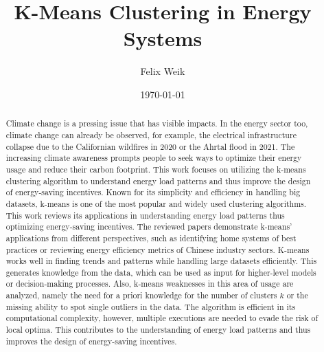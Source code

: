 \documentclass{revtex4-2}
\begin{document}
\title{K-Means Clustering in Energy Systems}
\author{Felix Weik}
\date{\today}


\begin{abstract}
Climate change is a pressing issue that has visible impacts.
In the energy sector too, climate change can already be observed, for example, the electrical infrastructure collapse due to the Californian wildfires in 2020 or the Ahrtal flood in 2021.
The increasing climate awareness prompts people to seek ways to optimize their energy usage and reduce their carbon footprint.
This work focuses on utilizing the k-means clustering algorithm to understand energy load patterns and thus improve the design of energy-saving incentives.
Known for its simplicity and efficiency in handling big datasets, k-means is one of the most popular and widely used clustering algorithms.
This work reviews its applications in understanding energy load patterns thus optimizing energy-saving incentives.
The reviewed papers demonstrate k-means' applications from different perspectives, such as identifying home systems of best practices or reviewing energy efficiency metrics of Chinese industry sectors.
K-means works well in finding trends and patterns while handling large datasets efficiently.
This generates knowledge from the data, which can be used as input for higher-level models or decision-making processes.
Also, k-means weaknesses in this area of usage are analyzed, namely the need for a priori knowledge for the number of clusters $k$ or the missing ability to spot single outliers in the data.
The algorithm is efficient in its computational complexity, however, multiple executions are needed to evade the risk of local optima.
This contributes to the understanding of energy load patterns and thus improves the design of energy-saving incentives.
\end{abstract}

\maketitle












\clearpage

\end{document}
